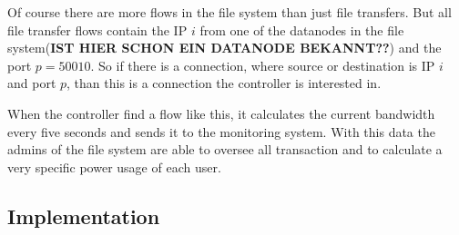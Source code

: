  Of course there are more flows in the file system than just file transfers. But all file transfer flows contain the IP $i$ from one of the datanodes in the file system(\textbf{IST HIER SCHON EIN DATANODE BEKANNT??}) and the port $p=50010$. So if there is a connection, where source or destination is IP $i$ and port $p$, than this is a connection the controller is interested in.
 
 When the controller find a flow like this, it calculates the current bandwidth every five seconds and sends it to the monitoring system. With this data the admins of the file system are able to oversee all transaction and to calculate a very specific power usage of each user. 
 
 \subsection{Implementation}               




          